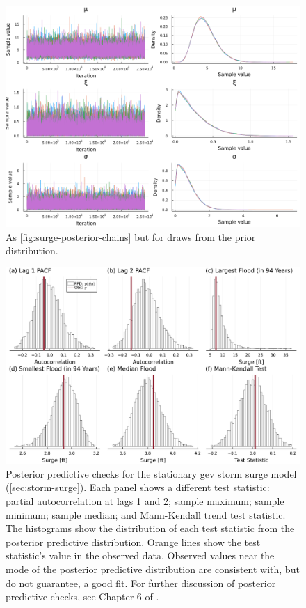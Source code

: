 \documentclass[12pt]{article}
\begin{document}
\begin{figure}
    \centering
    \includegraphics[width=\textwidth]{surge-prior-chains}
    \caption{
        As \cref{fig:surge-posterior-chains} but for draws from the prior distribution.
    }\label{fig:surge-prior-chains}
\end{figure}

\begin{figure}
    \centering
    \includegraphics[width=\textwidth]{surge-test-statistics}
    \caption{
        Posterior predictive checks for the stationary \gls{gev} storm surge model (\cref{sec:storm-surge}).
        Each panel shows a different test statistic: partial autocorrelation at lags 1 and 2; sample maximum; sample minimum; sample median; and Mann-Kendall trend test statistic.
        The histograms show the distribution of each test statistic from the posterior predictive distribution.
        Orange lines show the test statistic's value in the observed data.
        Observed values near the mode of the posterior predictive distribution are consistent with, but do not guarantee, a good fit.
        For further discussion of posterior predictive checks, see Chapter 6 of \citet{Gelman:2014tc}.
    }\label{fig:surge-test-statistics}
\end{figure}
\end{document}
